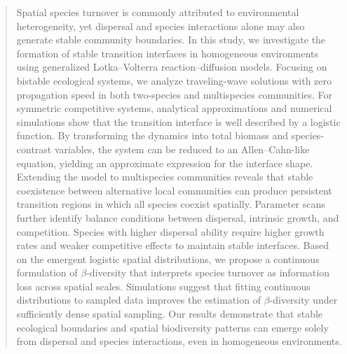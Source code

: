 \documentclass[12pt]{article}
\begin{document}
\begin{abstract}

Spatial species turnover is commonly attributed to environmental heterogeneity, yet dispersal and species interactions alone may also generate stable community boundaries. In this study, we investigate the formation of stable transition interfaces in homogeneous environments using generalized Lotka--Volterra reaction--diffusion models. Focusing on bistable ecological systems, we analyze traveling-wave solutions with zero propagation speed in both two-species and multispecies communities.
For symmetric competitive systems, analytical approximations and numerical simulations show that the transition interface is well described by a logistic function. By transforming the dynamics into total biomass and species-contrast variables, the system can be reduced to an Allen--Cahn-like equation, yielding an approximate expression for the interface shape. Extending the model to multispecies communities reveals that stable coexistence between alternative local communities can produce persistent transition regions in which all species coexist spatially.
Parameter scans further identify balance conditions between dispersal, intrinsic growth, and competition. Species with higher dispersal ability require higher growth rates and weaker competitive effects to maintain stable interfaces. Based on the emergent logistic spatial distributions, we propose a continuous formulation of $\beta$-diversity that interprets species turnover as information loss across spatial scales. Simulations suggest that fitting continuous distributions to sampled data improves the estimation of $\beta$-diversity under sufficiently dense spatial sampling.
Our results demonstrate that stable ecological boundaries and spatial biodiversity patterns can emerge solely from dispersal and species interactions, even in homogeneous environments.

\end{abstract}

\thispagestyle{empty}

\newpage
\end{document}
